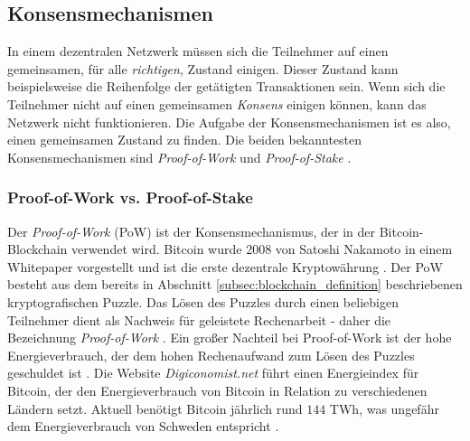 \subsection{Konsensmechanismen}

In einem dezentralen Netzwerk müssen sich die Teilnehmer auf einen gemeinsamen, für alle \textit{richtigen}, Zustand einigen. Dieser Zustand kann beispielsweise die Reihenfolge der getätigten Transaktionen sein. Wenn sich die Teilnehmer nicht auf einen gemeinsamen \textit{Konsens} einigen können, kann das Netzwerk nicht funktionieren. Die Aufgabe der Konsensmechanismen ist es also, einen gemeinsamen Zustand zu finden. Die beiden bekanntesten Konsensmechanismen sind \textit{Proof-of-Work} und \textit{Proof-of-Stake} \parencite[S. 87]{Alam_BlockchainConsensusMechanism}.

\subsubsection{Proof-of-Work vs. Proof-of-Stake}

Der \textit{Proof-of-Work} (PoW) ist der Konsensmechanismus, der in der Bitcoin-Blockchain verwendet wird. Bitcoin wurde 2008 von Satoshi Nakamoto in einem Whitepaper vorgestellt und ist die erste dezentrale Kryptowährung \parencites{Nakamoto_Bitcoin}{Zhang_DoubleSpendingWithASybilAttack}. Der PoW besteht aus dem bereits in Abschnitt \ref{subsec:blockchain_definition}  beschriebenen kryptografischen Puzzle. Das Lösen des Puzzles durch einen beliebigen Teilnehmer dient als Nachweis für geleistete Rechenarbeit - daher die Bezeichnung \textit{Proof-of-Work} \parencite[S. 27]{Brünnler_BlockchainKurzGut}. Ein großer Nachteil bei Proof-of-Work ist der hohe Energieverbrauch, der dem hohen Rechenaufwand zum Lösen des Puzzles geschuldet ist \parencite{Zhang_EvaluationOfEnergyConsumptionInBlockChains}. Die Website \textit{Digiconomist.net} führt einen Energieindex für Bitcoin, der den Energieverbrauch von Bitcoin in Relation zu verschiedenen Ländern setzt. Aktuell benötigt Bitcoin jährlich rund $144$ TWh, was ungefähr dem Energieverbrauch von Schweden entspricht \parencite{Digiconomist_BitcoinEnergyConsumption}.


